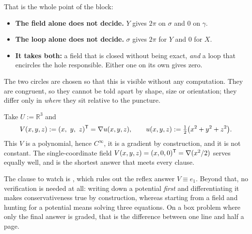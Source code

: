 \begin{exercisesolution}
\begin{remark}
That is the whole point of the block:
\begin{itemize}
  \item \textbf{The field alone does not decide.} $Y$ gives $2\pi$ on $\sigma$ and $0$ on $\gamma$.
  \item \textbf{The loop alone does not decide.} $\sigma$ gives $2\pi$ for $Y$ and $0$ for $X$.
  \item \textbf{It takes both:} a field that is closed without being exact, \emph{and} a loop that
    encircles the hole responsible. Either one on its own gives zero.
\end{itemize}
The two circles are chosen so that this is visible without any computation. They are congruent, so
they cannot be told apart by shape, size or orientation; they differ only in \emph{where} they sit
relative to the puncture.
\end{remark}
\end{exercisesolution}

\begin{exercisesolution}
\label{sol:box_nonconstant_conservative_field}
Take $U := \mathbb{R}^3$ and
\[V(x,y,z) := (x,\ y,\ z)^{\mathsf{T}} = \nabla u(x,y,z), \qquad
  u(x,y,z) := \tfrac12\big(x^2+y^2+z^2\big).\]
This $V$ is a polynomial, hence $C^\infty$, it is a gradient by construction, and it is not
constant. The single-coordinate field $V(x,y,z) = (x,0,0)^{\mathsf{T}} = \nabla(x^2/2)$ serves equally
well, and is the shortest answer that meets every clause.
\begin{remark}
The clause to watch is , which rules out the reflex answer $V \equiv e_1$. Beyond
that, no verification is needed at all: writing down a potential \emph{first} and differentiating
it makes conservativeness true by construction, whereas starting from a field and hunting for a
potential means solving three equations. On a box problem where only the final answer is graded,
that is the difference between one line and half a page.
\end{remark}
\end{exercisesolution}

